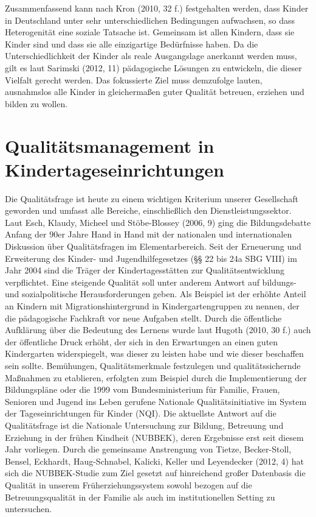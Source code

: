 Zusammenfassend kann nach Kron (2010, 32 f.) festgehalten werden, dass Kinder in Deutschland unter sehr unterschiedlichen Bedingungen aufwachsen, so dass Heterogenität eine soziale Tatsache ist. 
Gemeinsam ist allen Kindern, dass sie Kinder sind und dass sie alle einzigartige Bedürfnisse haben. 
Da die Unterschiedlichkeit der Kinder als reale Ausgangslage anerkannt werden muss, gilt es laut Sarimski (2012, 11) pädagogische Lösungen zu entwickeln, die dieser Vielfalt gerecht werden. Das fokussierte Ziel muss demzufolge lauten, ausnahmslos alle Kinder in gleichermaßen guter Qualität betreuen, erziehen und bilden zu wollen.  

\section{Qualitätsmanagement in Kindertageseinrichtungen}

Die Qualitätsfrage ist heute zu einem wichtigen Kriterium unserer Gesellschaft geworden und umfasst alle Bereiche, einschließlich den Dienstleistungssektor. Laut Esch, Klaudy, Micheel und Stöbe-Blossey (2006, 9) ging die Bildungsdebatte Anfang der 90er Jahre Hand in Hand mit der nationalen und internationalen Diskussion über Qualitätsfragen im Elementarbereich. Seit der Erneuerung und Erweiterung des Kinder- und Jugendhilfegesetzes (§§ 22 bis 24a SBG VIII) im Jahr 2004 sind die Träger der Kindertagesstätten zur Qualitätsentwicklung verpflichtet. Eine steigende Qualität soll unter anderem Antwort auf bildungs- und sozialpolitische Herausforderungen geben. Als Beispiel ist der erhöhte Anteil an Kindern mit Migrationshintergrund in Kindergartengruppen zu nennen, der die pädagogische Fachkraft vor neue Aufgaben stellt.
Durch die öffentliche Aufklärung über die Bedeutung des Lernens wurde laut Hugoth (2010, 30 f.) auch der öffentliche Druck erhöht, der sich in den Erwartungen an einen guten Kindergarten widerspiegelt, was dieser zu leisten habe und wie dieser beschaffen sein sollte. 
Bemühungen, Qualitätsmerkmale festzulegen und qualitätssichernde Maßnahmen zu etablieren, erfolgten zum Beispiel durch die Implementierung der Bildungspläne oder die 1999 vom Bundesministerium für Familie, Frauen, Senioren und Jugend ins Leben gerufene Nationale Qualitätsinitiative im System der Tageseinrichtungen für Kinder (NQI). 
Die aktuellste Antwort auf die Qualitätsfrage ist die Nationale Untersuchung zur Bildung, Betreuung und Erziehung in der frühen Kindheit (NUBBEK), deren Ergebnisse erst seit diesem Jahr vorliegen. Durch die gemeinsame Anstrengung von Tietze, Becker-Stoll, Bensel, Eckhardt, Haug-Schnabel, Kalicki, Keller und Leyendecker (2012, 4) hat sich die  NUBBEK-Studie zum Ziel gesetzt auf hinreichend großer Datenbasis die Qualität in unserem Früherziehungssystem sowohl bezogen auf die Betreuungsqualität in der Familie als auch im institutionellen Setting zu untersuchen. 
  
